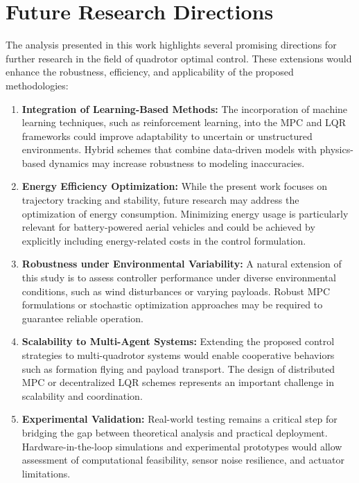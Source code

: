 \documentclass[a4paper,11pt,oneside]{book}
\begin{document}
\section{Future Research Directions}

The analysis presented in this work highlights several promising directions for further research in the field of quadrotor optimal control. These extensions would enhance the robustness, efficiency, and applicability of the proposed methodologies:

\begin{enumerate}
    \item \textbf{Integration of Learning-Based Methods:}  
    The incorporation of machine learning techniques, such as reinforcement learning, into the MPC and LQR frameworks could improve adaptability to uncertain or unstructured environments. Hybrid schemes that combine data-driven models with physics-based dynamics may increase robustness to modeling inaccuracies.  

    \item \textbf{Energy Efficiency Optimization:}  
    While the present work focuses on trajectory tracking and stability, future research may address the optimization of energy consumption. Minimizing energy usage is particularly relevant for battery-powered aerial vehicles and could be achieved by explicitly including energy-related costs in the control formulation.  

    \item \textbf{Robustness under Environmental Variability:}  
    A natural extension of this study is to assess controller performance under diverse environmental conditions, such as wind disturbances or varying payloads. Robust MPC formulations or stochastic optimization approaches may be required to guarantee reliable operation.  

    \item \textbf{Scalability to Multi-Agent Systems:}  
    Extending the proposed control strategies to multi-quadrotor systems would enable cooperative behaviors such as formation flying and payload transport. The design of distributed MPC or decentralized LQR schemes represents an important challenge in scalability and coordination.  

    \item \textbf{Experimental Validation:}  
    Real-world testing remains a critical step for bridging the gap between theoretical analysis and practical deployment. Hardware-in-the-loop simulations and experimental prototypes would allow assessment of computational feasibility, sensor noise resilience, and actuator limitations.  
\end{enumerate}
\end{document}

